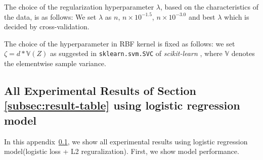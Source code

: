 The choice of the regularization hyperparameter $\lambda$, based on the characteristics of the data, is as follows:
We set $\lambda$ as $n$, $n\times 10^{-1.5}$, $n\times 10^{-3.0}$ and best $\lambda$ which is decided by cross-validation.

The choice of the hyperparameter in RBF kernel is fixed as follows: we set $\zeta = d * \mathbb{V}(Z)$ as suggested in {\tt sklearn.svm.SVC} of \emph{scikit-learn} \citep{scikit-learn}, where $\mathbb{V}$ denotes the elementwise sample variance.




\newpage
\subsection{All Experimental Results of Section \ref{subsec:result-table} using logistic regression model} \label{app:result-logistic}

In this appendix~\ref{app:result-logistic}, we show all experimental results using logistic regression model(logistic loss + L2 reguralization). First, we show model performance.

